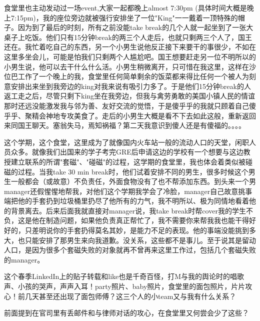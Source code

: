 \documentclass[12pt]{book}
\begin{document}
食堂里也主动发动过一场event,大家一起都晚上almost 7:30pm (具体时间大概是晚上7:15pm)，我的座位旁边就被强行安排坐了一位"King"一一戴着一顶特殊的帽子。因为到了最后的时刻，所有之前没能take break的几个人就一起坐到了一张大桌子上吃饭。他们只有15分钟break的两三个人走后，也就只剩两三个人了，国王还在。我忙着吃自己的东西，另一个小男生说他反正接下来要干的事很少，不如在这里多坐会儿，可能是怕我们只剩两个人尴尬吧。国王想要赶走另一位不明所以的小男生说，他可以去干什么什么活。小男生稍微离开，只可惜在我这里，这样在沙位巴工作了一个晚上的我，食堂里任何简单剩余的饭菜都来得比任何一个被人为刻意安排出来坐到我旁边的king对我来说有吸引力多了。于是他们15分钟break的人返工走之后，尽管只剩下king坐在我旁边，但我与禽劳勇敢的美国小镇人民的情谊那时还远没能激发我与邻为善、友好交流的觉悟，于是傻乎乎的我就只顾着自己傻乎乎、聚精会神地专攻美食了。走后的小男生大概是看不下去如此这般，重新返回来同国王聊天。塞翁失马，焉知祸福？第二天我意识到傻人还是有傻福的。。。。

这个学期，这个食堂，这里成为了就像国内火车站一般的流动人口的天堂，闲职人员众多。就像我们出国来的学子考完GRE后申请这边的学校有一个想要与这边教授建立联系的所谓"套磁"、"碰磁"的过程，这学期的食堂里，我也体会着类似被碰磁的过程。当我take 30 min break时，他们试着安排不同的男生，很多时候这个男生一般都会（或故意）不负责任，外面食物没有了也不帮添加东西。到头来一个男manager还假惺惺地帮我，对他们这个学期我学会了冷脸，manager自己故意挑事端把他的手套扔到垃圾桶里扔尽了他所有的力气，我不明所以、极为同情地看着他的背景离去。后来后面我就直接对manager说，我take break时帮cover我的学生不负，这是他在制造问题，如果他负责真正帮忙了，我不需要你来帮我我也能干得好好的，只差明说你的手套扔得莫名其妙，是能力不足的表现。他的事端没能挑到多大，也只能安排了那男生来向我道歉。没关系，这些都不是事儿。至于说其是留动人口，是因为很多个套磁失败的对象就再不曾再来这里工作过，包括几个套磁失败的manager。

这个春季LinkedIn上的贴子转载和like也是千奇百怪，打M与我的舆论时的唱歌声、小孩的哭声，声声入耳！party照片、baby照片，食堂里的面包照片，片片攻心！前几天甚至还出现了面包师傅？这三个人的小team又与我有什么关系？

前面提到在官司里有丢邮件和与律师对话的攻心，在食堂里又何尝会少了这些？
\end{document}
